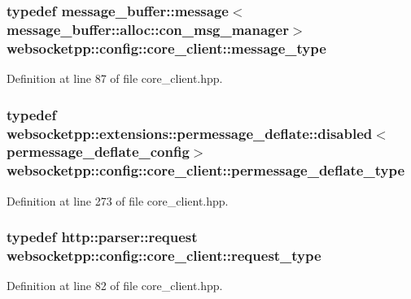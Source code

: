 \subsubsection[{message\+\_\+type}]{\setlength{\rightskip}{0pt plus 5cm}typedef {\bf message\+\_\+buffer\+::message}$<${\bf message\+\_\+buffer\+::alloc\+::con\+\_\+msg\+\_\+manager}$>$ {\bf websocketpp\+::config\+::core\+\_\+client\+::message\+\_\+type}}\label{structwebsocketpp_1_1config_1_1core__client_ae370adc4110d5d6c709167462467b11c}


Definition at line 87 of file core\+\_\+client.\+hpp.

\hypertarget{structwebsocketpp_1_1config_1_1core__client_a3887fabcaf40a720208c69a4604d37d2}{}
\subsubsection[{permessage\+\_\+deflate\+\_\+type}]{\setlength{\rightskip}{0pt plus 5cm}typedef {\bf websocketpp\+::extensions\+::permessage\+\_\+deflate\+::disabled}$<${\bf permessage\+\_\+deflate\+\_\+config}$>$ {\bf websocketpp\+::config\+::core\+\_\+client\+::permessage\+\_\+deflate\+\_\+type}}\label{structwebsocketpp_1_1config_1_1core__client_a3887fabcaf40a720208c69a4604d37d2}


Definition at line 273 of file core\+\_\+client.\+hpp.

\hypertarget{structwebsocketpp_1_1config_1_1core__client_a1fd74b16e3add246b1c356f6f14f206b}{}
\subsubsection[{request\+\_\+type}]{\setlength{\rightskip}{0pt plus 5cm}typedef {\bf http\+::parser\+::request} {\bf websocketpp\+::config\+::core\+\_\+client\+::request\+\_\+type}}\label{structwebsocketpp_1_1config_1_1core__client_a1fd74b16e3add246b1c356f6f14f206b}


Definition at line 82 of file core\+\_\+client.\+hpp.


